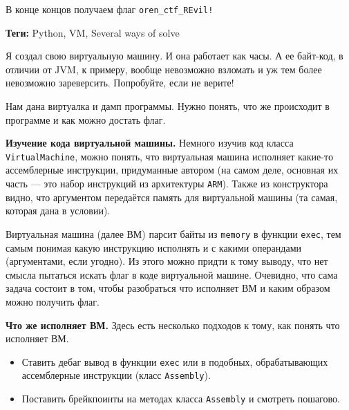 \documentclass[idxtotoc,hyperref,openany,oneside]{files/reverse} %
\begin{document}
В конце концов получаем флаг \verb|oren_ctf_REvil!|




\textbf{Теги:} Python, VM, Several ways of solve\vspace{\baselineskip}

\begin{tcolorbox}
Я создал свою виртуальную машину. И она работает как часы. А ее байт-код, в отличии от JVM, к примеру, вообще невозможно взломать и уж тем более невозможно зареверсить. Попробуйте, если не верите!
\end{tcolorbox}

Нам дана виртуалка и дамп программы. Нужно понять, что же происходит в программе и как можно достать флаг.

\textbf{Изучение кода виртуальной машины.}
Немного изучив код класса \verb|VirtualMachine|, можно понять, что виртуальная машина исполняет какие-то ассемблерные инструкции, придуманные автором (на самом деле, основная их часть — это набор инструкций из архитектуры \verb|ARM|). Также из конструктора видно, что аргументом передаётся память для виртуальной машины (та самая, которая дана в условии).

Виртуальная машина (далее ВМ) парсит байты из \verb|memory| в функции \verb|exec|, тем самым понимая какую инструкцию исполнять и с какими операндами (аргументами, если угодно). Из этого можно придти к тому выводу, что нет смысла пытаться искать флаг в коде виртуальной машине. Очевидно, что сама задача состоит в том, чтобы разобраться что исполняет ВМ и каким образом можно получить флаг.

\textbf{Что же исполняет ВМ.}
Здесь есть несколько подходов к тому, как понять что исполняет ВМ.
\begin{itemize}
\item Ставить дебаг вывод в функции \verb|exec| или в подобных, обрабатывающих ассемблерные инструкции (класс \verb|Assembly|).
\item Поставить брейкпоинты на методах класса \verb|Assembly| и смотреть пошагово.
\end{itemize}
\end{document}
